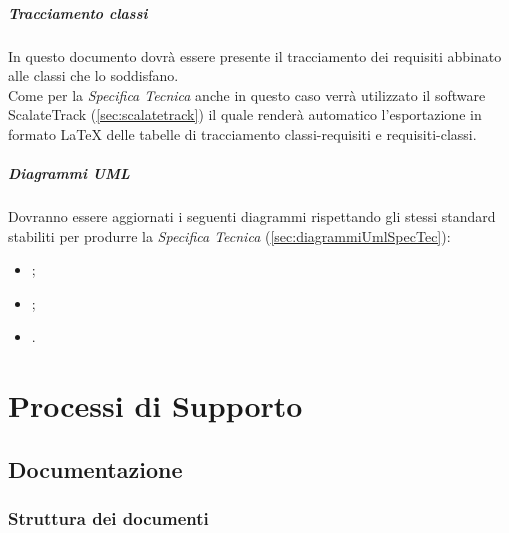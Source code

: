 \documentclass{scalatekids-article}
\begin{document}
\subparagraph{Tracciamento classi}

In questo documento dovrà essere presente il tracciamento dei requisiti abbinato
alle classi che lo soddisfano.\\Come per la \textit{Specifica Tecnica} anche in
questo caso verrà utilizzato il software ScalateTrack (\ref{sec:scalatetrack})
il quale renderà automatico l'esportazione in formato \LaTeX\xspace delle
tabelle di tracciamento classi-requisiti e requisiti-classi.

\subparagraph{Diagrammi UML}

Dovranno essere aggiornati i seguenti diagrammi rispettando gli stessi standard
stabiliti per produrre la \textit{Specifica Tecnica} (\ref{sec:diagrammiUmlSpecTec}):
\begin{itemize}
\item {};
\item {};
\item {}.
\end{itemize}

\section{Processi di Supporto}

\subsection{Documentazione}

\subsubsection{Struttura dei documenti}
\end{document}
